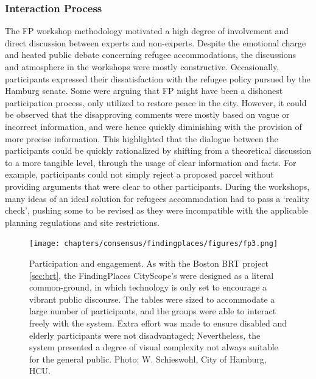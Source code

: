 {{        \subsubsection{Interaction Process}
        {
            The FP workshop methodology motivated a high degree of involvement and direct discussion between experts and non-experts. Despite the emotional charge and heated public debate concerning refugee accommodations, the discussions and atmosphere in the workshops were mostly constructive. Occasionally, participants expressed their dissatisfaction with the refugee policy pursued by the Hamburg senate. Some were arguing that FP might have been a dishonest participation process, only utilized to restore peace in the city.
            \newline
            However, it could be observed that the disapproving comments were mostly based on vague or incorrect information, and were hence quickly diminishing with the provision of more precise information. This highlighted that the dialogue between the participants could be quickly rationalized by shifting from a theoretical discussion to a more tangible level, through the usage of clear information and facts. For example, participants could not simply reject a proposed parcel without providing arguments that were clear to other participants. During the workshops, many ideas of an ideal solution for refugees accommodation had to pass a `reality check', pushing some to be revised as they were incompatible with the applicable planning regulations and site restrictions.
        }
    }

    \begin{figure}[!htb]
        \begin{center}
            \texttt{[image: chapters/consensus/findingplaces/figures/fp3.png]}
        \end{center}
        \caption{
            Participation and engagement. As with the Boston BRT project \eqref{sec:brt}, the FindingPlaces CityScope's were designed as a literal common-ground, in which technology is only set to encourage a vibrant public discourse. The tables were sized to accommodate a large number of participants, and the groups were able to interact freely with the system. Extra effort was made to ensure disabled and elderly participants were not disadvantaged; Nevertheless, the system presented a degree of visual complexity not always suitable for the general public. Photo: W. Schieswohl, City of Hamburg, HCU.
        }
        \label{fig:fp_engagement}
    \end{figure}

}

